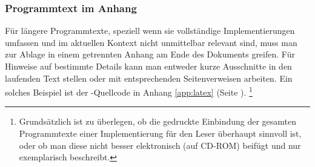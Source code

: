 \subsubsection{Programmtext im Anhang}

Für längere Programmtexte, speziell wenn sie vollständige
Implementierungen umfassen und im aktuellen Kontext nicht
unmittelbar relevant sind, muss man zur Ablage in einem getrennten
Anhang am Ende des Dokuments greifen. Für Hinweise auf bestimmte
Details kann man entweder kurze Ausschnitte in den laufenden Text
stellen oder mit entsprechenden Seitenverweisen arbeiten. Ein
solches Beispiel ist der \latex-Quellcode in Anhang
\ref{app:latex} (Seite \pageref{app:latex}).%
\footnote{%
Grundsätzlich ist zu überlegen, ob die gedruckte Einbindung der gesamten
Programmtexte einer Implementierung für den Leser überhaupt sinnvoll ist, oder
ob man diese nicht besser elektronisch (auf CD-ROM) beifügt und nur exemplarisch
beschreibt.}

